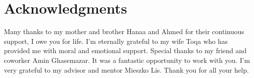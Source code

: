 
\chapter{Acknowledgments}

Many thanks to my mother and brother Hanaa and Ahmed for their continuous support, I owe you for life. I'm eternally grateful to my wife Toqa who has provided me with moral and emotional support.
Special thanks to my friend and coworker Amin Ghasemazar. It was a fantastic opportunity to work with you.
I'm very grateful to my advisor and mentor Mieszko Lis. Thank you for all your help.